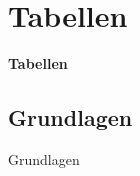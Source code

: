 \documentclass["WS\space 16-17\space -\space LaTeX-Kurs\space -\space Praesentation\space -\space 2.tex"]{subfiles}
\begin{document}
\section{Tabellen}
\begin{frame}[c]
	\begin{center}
		\LARGE \textbf{Tabellen}
	\end{center}
\end{frame}
\subsection{Grundlagen}
\begin{frame}[c]
	\begin{center}
		\large Grundlagen
	\end{center}
\end{frame}
\end{document}
